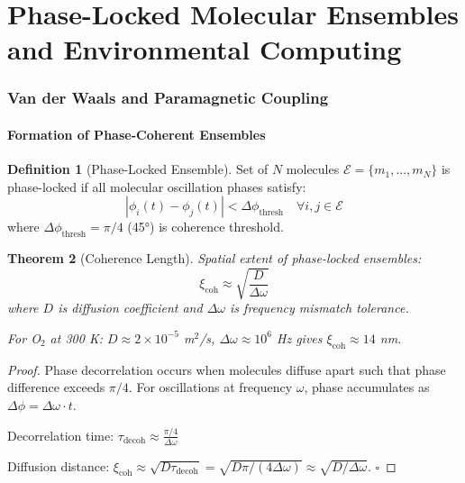 \documentclass[11pt,a4paper]{article}
\newtheorem{theorem}{Theorem}[section]
\theoremstyle{definition}
\newtheorem{definition}[theorem]{Definition}
\theoremstyle{remark}
\begin{document}
\part{Phase-Locked Molecular Ensembles and Environmental Computing}

\section{Van der Waals and Paramagnetic Coupling}

\subsection{Formation of Phase-Coherent Ensembles}

\begin{definition}[Phase-Locked Ensemble]
Set of $N$ molecules $\mathcal{E} = \{m_1, ..., m_N\}$ is phase-locked if all molecular oscillation phases satisfy:
\begin{equation}
|\phi_i(t) - \phi_j(t)| < \Delta\phi_{\text{thresh}} \quad \forall i, j \in \mathcal{E}
\end{equation}
where $\Delta\phi_{\text{thresh}} = \pi/4$ (45°) is coherence threshold.
\end{definition}

\begin{theorem}[Coherence Length]
Spatial extent of phase-locked ensembles:
\begin{equation}
\xi_{\text{coh}} \approx \sqrt{\frac{D}{\Delta\omega}}
\end{equation}
where $D$ is diffusion coefficient and $\Delta\omega$ is frequency mismatch tolerance.

For O$_2$ at 300 K: $D \approx 2 \times 10^{-5}$ m$^2$/s, $\Delta\omega \approx 10^6$ Hz gives $\xi_{\text{coh}} \approx 14$ nm.
\end{theorem}

\begin{proof}
Phase decorrelation occurs when molecules diffuse apart such that phase difference exceeds $\pi/4$. For oscillations at frequency $\omega$, phase accumulates as $\Delta\phi = \Delta\omega \cdot t$.

Decorrelation time: $\tau_{\text{decoh}} \approx \frac{\pi/4}{\Delta\omega}$

Diffusion distance: $\xi_{\text{coh}} \approx \sqrt{D \tau_{\text{decoh}}} = \sqrt{D\pi/(4\Delta\omega)} \approx \sqrt{D/\Delta\omega}$. $\square$
\end{proof}
\end{document}
